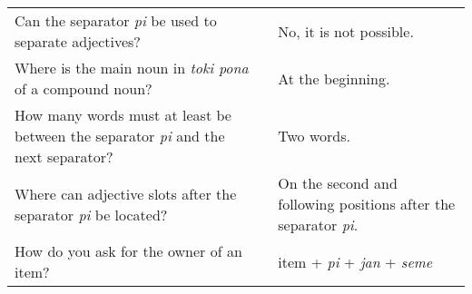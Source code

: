 \begin{supertabular}{p{5,5cm}|ll}
Can the separator \textit{pi} be used to separate adjectives? && No, it is not possible. \\ %
Where is the main noun in \textit{toki pona} of a compound noun? && At the beginning. \\ %
How many words must at least be between the separator \textit{pi} and the next separator? && Two words. \\ %
Where can adjective slots after the separator \textit{pi} be located? && On the second and following positions after the separator \textit{pi}. \\ %
How do you ask for the owner of an item? && item + \textit{pi} + \textit{jan} + \textit{seme} \\ %
\end{supertabular}

